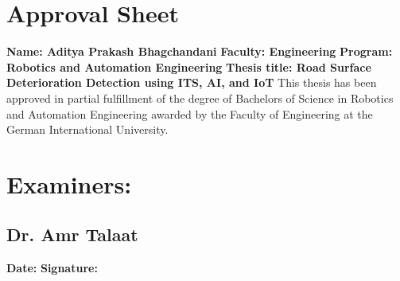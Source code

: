 \newpage
\section*{\Large Approval Sheet}
\textbf{Name: Aditya Prakash Bhagchandani}
\newline
\textbf{Faculty: Engineering}
\newline
\textbf{Program: Robotics and Automation Engineering}
\newline
\textbf{Thesis title: Road Surface Deterioration Detection using ITS, AI, and IoT}
\newline
\newline
\Large This thesis has been approved in partial fulfillment of the degree of Bachelors of Science in
Robotics and Automation Engineering awarded by the Faculty of Engineering at the German International
University.
\vspace{1cm}
\section*{Examiners:}
\vspace{0.3cm}
\subsection*{Dr. Amr Talaat}
\vspace{0.3cm}
\textbf{Date:}
\hspace{4cm}
\textbf{Signature:}
